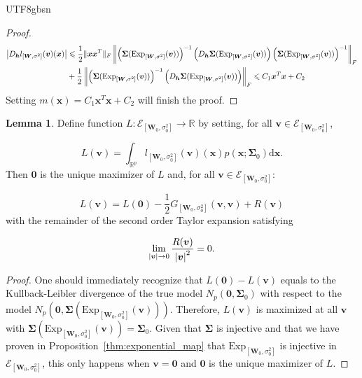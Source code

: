 \documentclass[12pt]{report}
\newcommand{\bracket}[1]{\left ( #1 \right )}
\theoremstyle{plain}
\theoremstyle{definition}
\newtheorem{lemma}[theorem]{Lemma}
\begin{document}
\begin{CJK*}{UTF8}{gbsn}
\begin{proof}
\begin{equation*}
  \begin{split}
  \abs{D_{\bm{h}}l_{[\bm{W}, \sigma^2]}(\bm{v})(\bm{x})} & 
  \leqslant \frac{1}{2} 	\|\bm{x}\bm{x}^T\|_F 
  \left \|\bracket{\bm{\Sigma}(\text{Exp}_{[\bm{W},\sigma^2]}(\bm{v}))}^{-1}
  \bracket{D_{\bm{h}}\bm{\Sigma}(\text{Exp}_{[\bm{W},\sigma^2]}(\bm{v}))}
  \bracket{\bm{\Sigma}(\text{Exp}_{[\bm{W},\sigma^2]}(\bm{v}))}^{-1} \right \|_F
  \\ & + \frac{1}{2}
  \left \|\bracket{\bm{\Sigma}(\text{Exp}_{[\bm{W},\sigma^2]}(\bm{v}))}^{-1}
  \bracket{D_{\bm{h}}\bm{\Sigma}(\text{Exp}_{[\bm{W},\sigma^2]}(\bm{v}))} \right \|_F
  \leqslant C_1 	\bm{x}^T\bm{x}
  + C_2
  \end{split}
\end{equation*}
Setting $m(\bm{x}) = C_1 	\bm{x}^T\bm{x}+ C_2$ will finish the proof.
\end{proof}

\begin{lemma}
Define function $L:\mathcal{E}_{[\bm{W}_0, \sigma_0^2]}\to \mathbb{R}$
by setting, for all $\bm{v} \in \mathcal{E}_{[\bm{W}_0, \sigma_0^2]}$,

\begin{equation*}
  L(\bm{v}) = \int_{\mathbb{R}^p} l_{[\bm{W}_0, \sigma_0^2]}(\bm{v})(\bm{x})
  p(\bm{x}; \bm{\Sigma}_0) \mathrm{d} \bm{x}.
\end{equation*}
Then $\bm{0}$ is the unique maximizer of $L$ and,
for all $\bm{v} \in \mathcal{E}_{[\bm{W}_0, \sigma_0^2]}$:

\begin{equation*}
  L(\bm{v}) = L(\bm{0}) - \frac{1}{2} G_{[\bm{W}_0, \sigma_0^2]}(\bm{v},\bm{v}) + R(\bm{v})
\end{equation*}
with the remainder of the second order Taylor expansion satisfying

\begin{equation*}
  \lim_{\abs{\bm{v}} \to 0} \frac{R(\bm{v})}{\abs{\bm{v}}^2} = 0.
\end{equation*}
\end{lemma}

\begin{proof}
One should immediately recognize that 
$L(\bm{0})-L(\bm{v})$ equals to the Kullback-Leibler divergence of the true model 
$N_p(\bm{0}, \bm{\Sigma}_0)$
with respect to the 
model $N_p \bracket{\bm{0}, \bm{\Sigma} \bracket{\text{Exp}_{[\bm{W}_0, \sigma_0^2]}(\bm{v})}}$.
Therefore, $L(\bm{v})$ is maximized at all $\bm{v}$
with $\bm{\Sigma} \bracket{\text{Exp}_{[\bm{W}_0, \sigma_0^2]}(\bm{v})} = \bm{\Sigma}_0$.
Given that $\bm{\Sigma}$ is injective and that we have proven 
in Proposition~\ref{thm:exponential_map} that
$\text{Exp}_{[\bm{W}_0, \sigma_0^2]}$ is injective in $\mathcal{E}_{[\bm{W}_0, \sigma_0^2]}$,
this only happens when $\bm{v} = \bm{0}$ and $\bm{0}$ is the unique maximizer of $L$.


\end{proof}
\end{CJK*}
\end{document}
